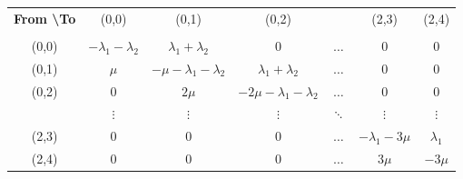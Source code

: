 \begin{frame}
    \tiny
    \renewcommand{\arraystretch}{1.5}
    \begin{tabular}{c|c|c|c|c|c|c|}
        \multicolumn{1}{c}{\textbf{From \textbackslash To}}
        & \multicolumn{1}{c}{(0,0)} & 
        \multicolumn{1}{c}{(0,1)} & \multicolumn{1}{c}{(0,2)} & 
        \multicolumn{1}{c}{} & \multicolumn{1}{c}{(2,3)} &
        \multicolumn{1}{c}{(2,4)} \\

        \multicolumn{1}{c}{} & \multicolumn{1}{c}{} & \multicolumn{1}{c}{} &
        \multicolumn{1}{c}{} & \multicolumn{1}{c}{} & \multicolumn{1}{c}{} & 
        \multicolumn{1}{c}{} \\

        \cline{2-7}
        (0,0) & \(-\lambda_1 - \lambda_2\) & \(\lambda_1 + \lambda_2\) & 0 & \(\dots\) & 0 & 0 \\
        \cline{2-7}
        (0,1) & \(\mu\) & \(-\mu - \lambda_1 - \lambda_2\) & \(\lambda_1 + \lambda_2\) & \(\dots\) & 0 & 0 \\
        \cline{2-7}
        (0,2) & 0 & \(2\mu\) & \(-2\mu - \lambda_1 - \lambda_2\) & \(\dots\) & 0 & 0 \\
        \cline{2-7}
        & \(\vdots\) & \(\vdots\) & \(\vdots\) & \(\ddots\) & \(\vdots\) & \(\vdots\) \\
        \cline{2-7}
        (2,3) & 0 & 0 & 0 & \(\dots\) & \(-\lambda_1 - 3\mu\) & \(\lambda_1\) \\
        \cline{2-7}
        (2,4) & 0 & 0 & 0 & \(\dots\) & \(3\mu\) & \(-3\mu\) \\
        \cline{2-7}
    \end{tabular}
\end{frame}


